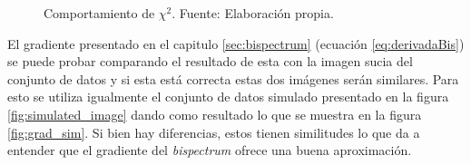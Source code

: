 \begin{figure}
 \centering
 \caption[Comportamiento de $\chi^{2}$.]{Comportamiento de $\chi^{2}$. Fuente: Elaboración propia.}
 \label{fig:chi2_comp}
\end{figure}

El gradiente presentado en el capitulo \ref{sec:bispectrum} (ecuación \ref{eq:derivadaBis}) se puede probar comparando el resultado de esta con la imagen sucia del conjunto de datos y si esta está correcta estas dos imágenes serán similares. Para esto se utiliza igualmente el conjunto de datos simulado presentado en la figura \ref{fig:simulated_image} dando como resultado lo que se muestra en la figura \ref{fig:grad_sim}. Si bien hay diferencias, estos tienen similitudes lo que da a entender que el gradiente del \textit{bispectrum} ofrece una buena aproximación. 

